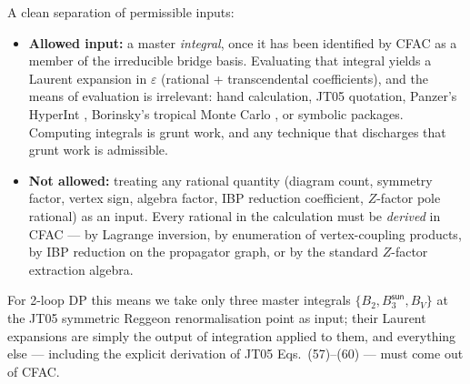 \documentclass[11pt,a4paper]{article}
\theoremstyle{definition}
\theoremstyle{plain}
\begin{document}
\begin{stdbox}
A clean separation of permissible inputs:
\begin{itemize}[leftmargin=2em]
  \item \textbf{Allowed input:} a master \emph{integral}, once it has
    been identified by CFAC as a member of the irreducible bridge
    basis.  Evaluating that integral yields a Laurent expansion in
    $\varepsilon$ (rational + transcendental coefficients), and the
    means of evaluation is irrelevant: hand calculation, JT05
    quotation, Panzer's HyperInt \cite{Panzer2014}, Borinsky's
    tropical Monte Carlo \cite{Borinsky2020}, or symbolic packages.
    Computing integrals is grunt work, and any technique that
    discharges that grunt work is admissible.
  \item \textbf{Not allowed:} treating any rational quantity (diagram
    count, symmetry factor, vertex sign, algebra factor, IBP
    reduction coefficient, $Z$-factor pole rational) as an input.
    Every rational in the calculation must be \emph{derived} in CFAC
    --- by Lagrange inversion, by enumeration of vertex-coupling
    products, by IBP reduction on the propagator graph, or by the
    standard $Z$-factor extraction algebra.
\end{itemize}
For 2-loop DP this means we take only three master integrals
$\{B_2, B_3^{\textsf{sun}}, B_V\}$ at the JT05 symmetric Reggeon
renormalisation point as input; their Laurent expansions are simply
the output of integration applied to them, and everything else ---
including the explicit derivation of JT05 Eqs.~(57)--(60) --- must
come out of CFAC.
\end{stdbox}
\end{document}
